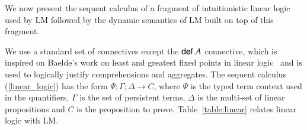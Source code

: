 
\newcommand{\mz}{\m{match} \;}
\newcommand{\tab}[0]{\;\;\;\;}
\newcommand{\dz}{\m{derive} \;}
\newcommand{\comp}[0]{\m{comp} \;}
\newcommand{\az}{\m{apply} \;}
\newcommand{\doz}{\m{run} \;}
\newcommand{\seqnocut}[3]{#1 ; #2 \Rightarrow #3}
\newcommand{\defeq}{\buildrel\triangle\over =}
\newcommand{\compr}[1]{\m{def} \; #1}

\newcommand{\mo}{\m{match}_{LLD} \;}
\newcommand{\cont}{\m{cont}_{LLD} \;}
\newcommand{\contc}{\m{cont}_{LLDc} \;}
\newcommand{\done}{\m{derive}_{LLD} \;}
\newcommand{\doo}{\m{run}_{LLD} \;}
\newcommand{\mc}[0]{\m{match}_{LLDc} \; }
\newcommand{\dall}[0]{\m{fix}_{LLD} \; }
\newcommand{\strans}[0]{\m{update}_{LLD} \;}
\newcommand{\dc}{\m{derive}_{LLDc} \;}
\newcommand{\ao}{\m{apply}_{LLD} \;}

We now present the sequent calculus of a fragment of intuitionistic linear
logic~\cite{girard-87} used by LM followed by the dynamic semantics of LM built on top of
this fragment.

We use a standard set of connectives except the $\mathsf{def} \; A$ connective, which is inspired on Baelde's work on least and
greatest fixed points in linear logic~\cite{Baelde:2012:LGF:2071368.2071370} and is used to logically justify
comprehensions and aggregates.
The sequent calculus (\ref{linear_logic}) has the form $\Psi; \Gamma; \Delta \rightarrow C$, where $\Psi$ is the typed term context used in the
quantifiers, $\Gamma$ is the set of persistent terms, $\Delta$ is the multi-set of linear propositions and $C$ is the proposition
to prove. Table~\ref{table:linear} relates linear logic with LM.

